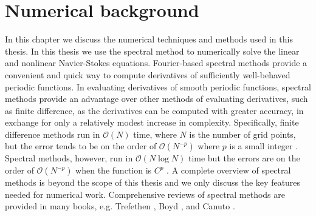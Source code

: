\chapter{Numerical background}

In this chapter we discuss the numerical techniques and methods used in this thesis. In this thesis we use the spectral method to numerically solve the linear and nonlinear Navier-Stokes equations. Fourier-based spectral methods provide a convenient and quick way to compute derivatives of sufficiently well-behaved periodic functions. In evaluating derivatives of smooth periodic functions, spectral methods provide an advantage over other methods of evaluating derivatives, such as finite difference, as the derivatives can be computed with greater accuracy, in exchange for only a relatively modest increase in complexity. Specifically, finite difference methods run in $\mathcal{O}(N)$ time, where $N$ is the number of grid points, but the error tends to be on the order of $\mathcal{O}(N^{-p})$ where $p$ is a small integer \cite{durran}. Spectral methods, however, run in $\mathcal{O}(N\log N)$ time but the errors are on the order of $\mathcal{O}(N^{-p})$ when the function is $C^{p}$ \cite{trefethen_spectral}. A complete overview of spectral methods is beyond the scope of this thesis and we only discuss the key features needed for numerical work. Comprehensive reviews of spectral methods are provided in many books, e.g. Trefethen \cite{trefethen_spectral}, Boyd \cite{boyd2001}, and Canuto \cite{canuto}.


